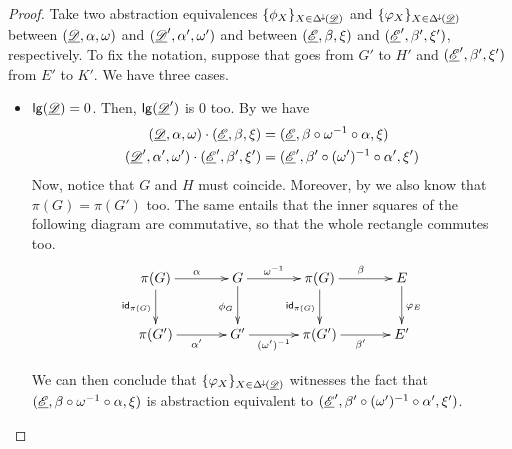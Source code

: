 \begin{proof} Take two abstraction equivalences $\{\phi_X\}_{X\in \Delta^{\hspace{-1pt}\downarrow\hspace{-1pt}}(\underline{\mathscr{D}})}$ and $\{\varphi_X\}_{X\in \Delta^{\hspace{-1pt}\downarrow\hspace{-1pt}}(\underline{\mathscr{D}})}$ between $(\underline{\mathscr{D}}, \alpha, \omega)$ and $(\underline{\mathscr{D}}', \alpha', \omega')$ and between $(\underline{\mathscr{E}}, \beta, \xi)$ and $(\underline{\mathscr{E}}', \beta', \xi')$, respectively. To fix the notation, suppose that goes from $G'$ to $H'$ and $(\underline{\mathscr{E}}', \beta', \xi')$ from $E'$ to $K'$. We have three cases.
	
\begin{itemize}
	\item $\mathsf{lg}(\underline{\mathscr{D}})=0$. Then, $\mathsf{lg}(\underline{\mathscr{D}}')$ is $0$ too. By  we have
	\begin{align*}
	(\underline{\mathscr{D}}, \alpha, \omega)\cdot (\underline{\mathscr{E}}, \beta, \xi)&=(\underline{\mathscr{E}}, \beta\circ \omega^{-1}\circ \alpha, \xi)\\
		(\underline{\mathscr{D}}', \alpha', \omega')\cdot (\underline{\mathscr{E}}', \beta', \xi')&=(\underline{\mathscr{E}}', \beta'\circ (\omega')^{-1}\circ \alpha', \xi')
	\end{align*}
 Now, notice that $G$ and $H$ must coincide. Moreover, by  we also know that $\pi(G)=\pi(G')$ too. The same  entails that the inner squares of the following diagram are commutative, so that the whole rectangle commutes too.
 \[\xymatrix@C=35pt{\pi(G) \ar[r]^{\alpha} \ar[d]_{\id{\pi(G)}}& G  \ar[d]_{\phi_G}\ar[r]^-{\omega^{-1}} & \pi(G) \ar[d]_{\id{\pi(G)}} \ar[r]^{\beta}& E \ar[d]^{\varphi_E}\\\pi(G') \ar[r]_{\alpha'}& G' \ar[r]_-{(\omega')^{-1}} & \pi(G') \ar[r]_{\beta'} & E'}\]
 
 We can  then conclude that $\{\varphi_X\}_{X\in \Delta^{\hspace{-1pt}\downarrow\hspace{-1pt}}(\underline{\mathscr{D}})}$ witnesses the fact that $(\underline{\mathscr{E}}, \beta\circ \omega^{-1}\circ \alpha, \xi)$ is abstraction equivalent to $(\underline{\mathscr{E}}', \beta'\circ (\omega')^{-1}\circ \alpha', \xi')$.


\end{itemize}
\end{proof}
